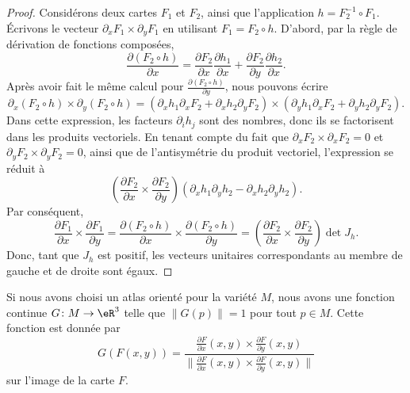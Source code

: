 \begin{proof}
	Considérons deux cartes \( F_1\) et \( F_2\), ainsi que l'application \( h=F_2^{-1}\circ F_1\). Écrivons le vecteur \( \partial_x F_1\times\partial_yF_1\) en utilisant \( F_1=F_2\circ h\). D'abord, par la règle de dérivation de fonctions composées,
	\begin{equation}
		\frac{ \partial (F_2\circ h) }{ \partial x }=\frac{ \partial F_2 }{ \partial x }\frac{ \partial h_1 }{ \partial x }+\frac{ \partial F_2 }{ \partial y }\frac{ \partial h_2 }{ \partial x }.
	\end{equation}
	Après avoir fait le même calcul pour \( \frac{ \partial (F_2\circ h) }{ \partial y }\), nous pouvons écrire
	\begin{equation}
		\partial_x(F_2\circ h)\times\partial_y(F_2\circ h)=(\partial_xh_1\partial_xF_2+\partial_xh_2\partial_yF_2)\times(\partial_yh_1\partial_xF_2+\partial_yh_2\partial_yF_2).
	\end{equation}
	Dans cette expression, les facteurs \( \partial_ih_j\) sont des nombres, donc ils se factorisent dans les produits vectoriels. En tenant compte du fait que \( \partial_xF_2\times\partial_xF_2=0\) et \( \partial_yF_2\times\partial_yF_2=0\), ainsi que de l'antisymétrie du produit vectoriel, l'expression se réduit à
	\begin{equation}
		\left( \frac{ \partial F_2 }{ \partial x }\times\frac{ \partial F_2 }{ \partial y } \right)(\partial_xh_1\partial_yh_2-\partial_xh_2\partial_yh_2).
	\end{equation}
	Par conséquent,
	\begin{equation}
		\frac{ \partial F_1 }{ \partial x }\times\frac{ \partial F_1 }{ \partial y } =\frac{ \partial (F_2\circ h) }{ \partial x }\times\frac{ \partial (F_2\circ h) }{ \partial y } =\left( \frac{ \partial F_2 }{ \partial x }\times\frac{ \partial F_2 }{ \partial y } \right)\det J_h.
	\end{equation}
	Donc, tant que \( J_h\) est positif, les vecteurs unitaires correspondants au membre de gauche et de droite sont égaux.
\end{proof}

\begin{corollary}
	Si nous avons choisi un atlas orienté pour la variété \( M\), nous avons une fonction continue \( G\colon M\to \eR^3\) telle que \( \| G(p) \|=1\) pour tout \( p\in M\). Cette fonction est donnée par
	\begin{equation}		\label{DefCarteGOritn}
		G(F(x,y))=\frac{   \frac{ \partial F }{ \partial x }(x,y)\times\frac{ \partial F }{ \partial y }(x,y)   }{ \| \frac{ \partial F }{ \partial x }(x,y)\times\frac{ \partial F }{ \partial y }(x,y)\| }
	\end{equation}
	sur l'image de la carte \( F\).
\end{corollary}

